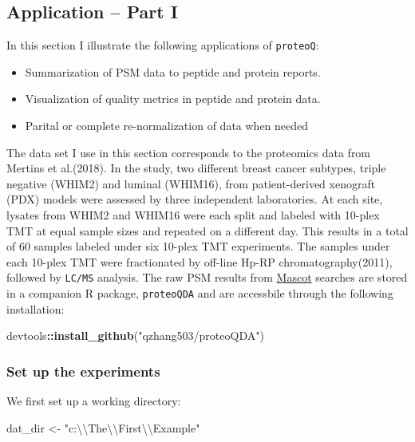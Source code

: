 \documentclass[]{article}
\newenvironment{Shaded}{\begin{snugshade}}{\end{snugshade}}
\newcommand{\CharTok}[1]{\textcolor[rgb]{0.31,0.60,0.02}{#1}}
\newcommand{\KeywordTok}[1]{\textcolor[rgb]{0.13,0.29,0.53}{\textbf{#1}}}
\newcommand{\NormalTok}[1]{#1}
\newcommand{\OperatorTok}[1]{\textcolor[rgb]{0.81,0.36,0.00}{\textbf{#1}}}
\newcommand{\StringTok}[1]{\textcolor[rgb]{0.31,0.60,0.02}{#1}}
\providecommand{\tightlist}{%
  \setlength{\itemsep}{0pt}\setlength{\parskip}{0pt}}
\begin{document}
\hypertarget{application-part-i}{%
\subsection{Application -- Part I}\label{application-part-i}}

In this section I illustrate the following applications of
\texttt{proteoQ}:

\begin{itemize}
\tightlist
\item
  Summarization of PSM data to peptide and protein reports.
\item
  Visualization of quality metrics in peptide and protein data.
\item
  Parital or complete re-normalization of data when needed
\end{itemize}

The data set I use in this section corresponds to the proteomics data
from Mertins et al.(2018). In the study, two different breast cancer
subtypes, triple negative (WHIM2) and luminal (WHIM16), from
patient-derived xenograft (PDX) models were assessed by three
independent laboratories. At each site, lysates from WHIM2 and WHIM16
were each split and labeled with 10-plex TMT at equal sample sizes and
repeated on a different day. This results in a total of 60 samples
labeled under six 10-plex TMT experiments. The samples under each
10-plex TMT were fractionated by off-line Hp-RP chromatography(2011),
followed by \texttt{LC/MS} analysis. The raw PSM results from
\href{https://http://www.matrixscience.com/}{Mascot} searches are stored
in a companion R package, \texttt{proteoQDA} and are accessbile through
the following installation:

\begin{Shaded}
\begin{Highlighting}[]
\NormalTok{devtools}\OperatorTok{::}\KeywordTok{install_github}\NormalTok{(}\StringTok{"qzhang503/proteoQDA"}\NormalTok{)}
\end{Highlighting}
\end{Shaded}

\hypertarget{set-up-the-experiments}{%
\subsubsection{Set up the experiments}\label{set-up-the-experiments}}

We first set up a working directory:

\begin{Shaded}
\begin{Highlighting}[]
\NormalTok{dat_dir <-}\StringTok{ "c:}\CharTok{\textbackslash{}\textbackslash{}}\StringTok{The}\CharTok{\textbackslash{}\textbackslash{}}\StringTok{First}\CharTok{\textbackslash{}\textbackslash{}}\StringTok{Example"}
\end{Highlighting}
\end{Shaded}
\end{document}
